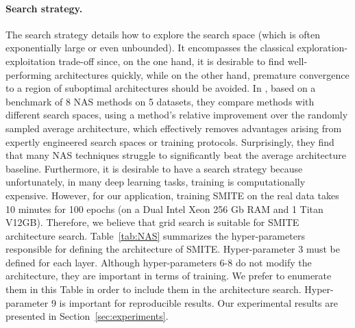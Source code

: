 \documentclass{article}
\begin{document}
\paragraph{Search strategy.}

The search strategy details how to explore the search space
(which is often exponentially large or even unbounded). It encompasses the classical exploration-exploitation trade-off since, on the one hand, it is desirable to find
well-performing architectures quickly, while on the other hand, premature convergence to a region of suboptimal architectures should be avoided. In \cite{yang2019evaluation},  based on a benchmark of 8 NAS methods on 5 datasets, they compare methods with different search spaces, using a method’s relative improvement over the randomly sampled average architecture, which effectively removes advantages arising from expertly engineered search spaces or training protocols. Surprisingly, they find that many NAS techniques struggle to significantly beat the average architecture baseline. Furthermore, it is desirable to have a search strategy because unfortunately, in many deep learning tasks, training is computationally expensive. However, for our application, training SMITE on the real data takes 10 minutes for 100 epochs (on a Dual Intel Xeon 256 Gb RAM and 1 Titan V12GB). Therefore, we believe that grid search is suitable for SMITE architecture search. Table~\ref{tab:NAS} summarizes the hyper-parameters responsible for defining the architecture of SMITE. Hyper-parameter 3 must be defined for each layer. Although hyper-parameters 6-8 do not modify the architecture, they are important in terms of training. We prefer to enumerate them in this Table in order to include them in the architecture search. Hyper-parameter 9 is important for reproducible results. Our experimental results are presented in Section~\ref{sec:experiments}.
\end{document}
